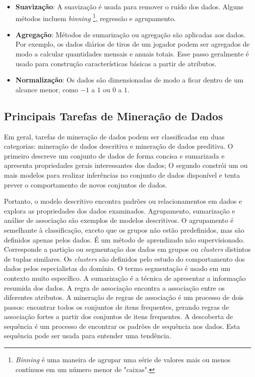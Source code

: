 \begin{itemize}
  \item 
  \textbf{Suavização}: A suavização é usada para remover o ruído dos dados. Alguns métodos incluem \textit{binning} \footnote{\textit{Binning} é uma maneira de agrupar uma série de valores mais ou menos contínuos em um número menor de "caixas".}, regressão e agrupamento.
  \item
\textbf{Agregação}: Métodos de sumarização ou agregação são aplicadas aos dados. Por exemplo, os dados diários de tiros de um jogador podem ser agregados de modo a calcular quantidades mensais e anuais totais. Esse passo geralmente é usado para  construção características básicas a partir de atributos.
  \item 
\textbf{Normalização}: Os dados são dimensionadas de modo a ficar dentro de um alcance menor, como $-1$ a $1$ ou $0$ a $1$.
\end{itemize}

\subsection{Principais Tarefas de Mineração de Dados}
Em geral, tarefas de mineração de dados podem ser classificadas em duas categorias: mineração de dados descritiva e mineração de dados preditiva. O primeiro descreve um conjunto de dados de forma concisa e sumarizada e apresenta propriedades gerais interessantes dos dados; O segundo constrói um ou mais modelos para realizar inferências no conjunto de dados disponível e tenta prever o comportamento de novos conjuntos de dados.

Portanto, o modelo descritivo encontra padrões ou relacionamentos em dados e explora as propriedades dos dados examinados. Agrupamento, sumarização e análise de associação são exemplos de modelos descritivos. O agrupamento é semelhante à classificação, exceto que os grupos não estão predefinidos, mas são definidos apenas pelos dados. É um método de aprendizado não supervisionado. Corresponde a partição ou segmentação dos dados em grupos ou \textit{clusters} distintos de tuplas similares. Os \textit{clusters} são definidos pelo estudo do comportamento dos dados pelos especialistas do domínio. O termo segmentação é usado em um contexto muito específico. A sumarização é a técnica de apresentar a informação resumida dos dados. A regra de associação encontra a associação entre os diferentes atributos. A mineração de regras de associação é um processo de dois passos: encontrar todos os conjuntos de itens frequentes, gerando regras de associação fortes a partir dos conjuntos de itens frequentes. A descoberta de sequência é um processo de encontrar os padrões de sequência nos dados. Esta sequência pode ser usada para entender uma tendência.

